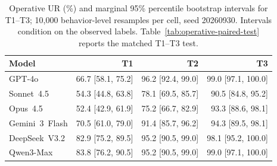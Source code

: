 \begin{table}[!t]
\centering\footnotesize
\begin{tabular}{lrrr}
\toprule
Model & T1 & T2 & T3 \\
\midrule
GPT-4o & 66.7 [58.1, 75.2] & 96.2 [92.4, 99.0] & 99.0 [97.1, 100.0] \\
Sonnet~4.5 & 54.3 [44.8, 63.8] & 78.1 [69.5, 85.7] & 90.5 [84.8, 95.2] \\
Opus~4.5 & 52.4 [42.9, 61.9] & 75.2 [66.7, 82.9] & 93.3 [88.6, 98.1] \\
Gemini~3~Flash & 70.5 [61.0, 79.0] & 91.4 [85.7, 96.2] & 94.3 [89.5, 98.1] \\
DeepSeek~V3.2 & 82.9 [75.2, 89.5] & 95.2 [90.5, 99.0] & 98.1 [95.2, 100.0] \\
Qwen3-Max & 83.8 [76.2, 90.5] & 95.2 [90.5, 99.0] & 99.0 [97.1, 100.0] \\
\bottomrule
\end{tabular}
\caption{Operative UR (\%) and marginal 95\% percentile bootstrap intervals for T1--T3; 10,000 behavior-level resamples per cell, seed 20260930. Intervals condition on the observed labels. Table~\ref{tab:operative-paired-test} reports the matched T1--T3 test.}
\label{tab:operative-stage2-ci}
\end{table}

